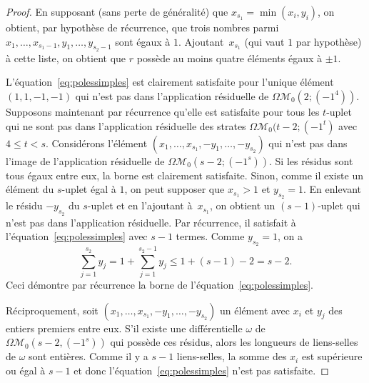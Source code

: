 \documentclass[11pt]{article}
\numberwithin{equation}{section}\renewcommand{\proofname}{Démonstration}
\let\mathcal\mathscr
\newcommand{\omoduli}[1][g]{{\Omega\mathcal M}_{\!#1}}
\theoremstyle{definition}
\begin{document}
\begin{proof}
En supposant (sans perte de généralité) que $x_{s_{1}}=\min(x_{i},y_{i})$, on obtient, par hypothèse de récurrence, que trois nombres parmi $x_{1},\dots,x_{s_{1}-1},y_{1},\dots,y_{s_{2}-1}$ sont égaux à $1$. Ajoutant~$x_{s_{1}}$ (qui vaut $1$ par hypothèse) à cette liste, on obtient que $r$ possède au moins quatre éléments égaux à $\pm 1$.

L'équation~\eqref{eq:polessimples} est clairement satisfaite pour l'unique élément $(1,1,-1,-1)$ qui n'est pas dans l'application résiduelle de $\omoduli[0](2;(-1^{4}))$. Supposons maintenant par récurrence qu'elle est satisfaite pour tous les $t$-uplet qui ne sont pas dans l'application résiduelle des strates $\omoduli[0](t-2;(-1^{t})$ avec $4 \leq t<s$. Considérons l'élément $(x_{1},\dots,x_{s_{1}},-y_{1},\dots,-y_{s_{2}})$ qui n'est pas dans l'image de l'application résiduelle de $\omoduli[0](s-2;(-1^{s}))$.
Si les résidus sont tous égaux entre eux, la borne est clairement satisfaite. Sinon, comme il existe un élément du $s$-uplet égal à $1$, on peut supposer que $x_{s_{1}}>1$ et $y_{s_{2}}=1$. En enlevant le résidu $-y_{s_{2}}$ du $s$-uplet et en l'ajoutant à~$x_{s_{1}}$, on obtient un $(s-1)$-uplet qui n'est pas dans l'application résiduelle. Par récurrence, il satisfait à l'équation~\eqref{eq:polessimples} avec $s-1$ termes. Comme $y_{s_{2}} = 1$, on a\vspace*{-3pt}
\[
\sum_{j=1}^{s_{2}} y_{j} = 1 + \sum_{j=1}^{s_{2}-1} y_{j} \leq 1 + (s-1)-2 = s-2.\]
Ceci démontre par récurrence la borne de l'équation~\eqref{eq:polessimples}.

Réciproquement, soit $(x_{1},\dots,x_{s_{1}},-y_{1},\dots,-y_{s_{2}})$ un élément avec $x_{i}$ et $y_{j}$ des entiers premiers entre eux. S'il existe une différentielle $\omega$ de $\omoduli[0](s-2,(-1^{s}))$ qui possède ces résidus, alors les longueurs de liens-selles de $\omega$ sont entières. Comme il y a $s-1$ liens-selles, la somme des $x_{i}$ est supérieure ou égal à $s-1$ et donc l'équation~\eqref{eq:polessimples} n'est pas satisfaite.
\end{proof}
\end{document}
